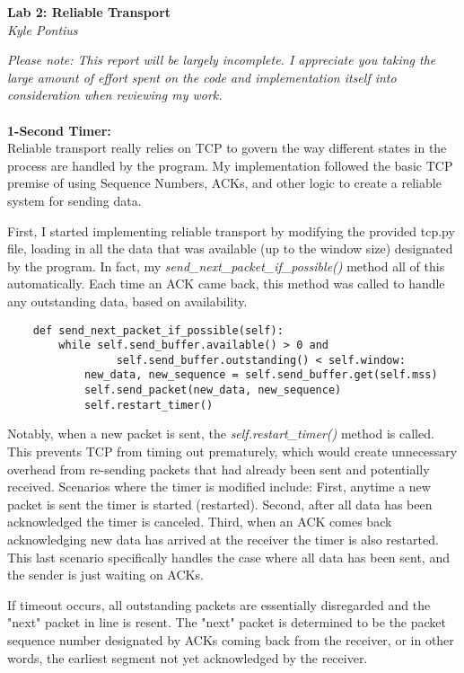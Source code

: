 \documentclass[11pt]{article}
\begin{document}
\begin{center}
  \Large\textbf{Lab 2: Reliable Transport}\\
  \large\textit{Kyle Pontius}
\end{center}

{\small  \textit{Please note: This report will be largely incomplete. I appreciate you taking the large amount of effort spent on the code and implementation itself into consideration when reviewing my work.}}\\\\
\large\textbf{1-Second Timer:}\\
Reliable transport really relies on TCP to govern the way different states in the process are handled by the program. My implementation followed the basic TCP premise of using Sequence Numbers, ACKs, and other logic to create a reliable system for sending data.

First, I started implementing reliable transport by modifying the provided tcp.py file, loading in all the data that was available (up to the window size) designated by the program. In fact, my \textit{send\_next\_packet\_if\_possible()} method all of this automatically. Each time an ACK came back, this method was called to handle any outstanding data, based on availability.

\begin{verbatim}
    def send_next_packet_if_possible(self):
        while self.send_buffer.available() > 0 and
                 self.send_buffer.outstanding() < self.window:
            new_data, new_sequence = self.send_buffer.get(self.mss)
            self.send_packet(new_data, new_sequence)
            self.restart_timer()
\end{verbatim}

Notably, when a new packet is sent, the \textit{self.restart\_timer()} method is called. This prevents TCP from timing out prematurely, which would create unnecessary overhead from re-sending packets that had already been sent and potentially received. Scenarios where the timer is modified include: First, anytime a new packet is sent the timer is started (restarted). Second, after all data has been acknowledged the timer is canceled. Third, when an ACK comes back acknowledging new data has arrived at the receiver the timer is also restarted. This last scenario specifically handles the case where all data has been sent, and the sender is just waiting on ACKs.

If timeout occurs, all outstanding packets are essentially disregarded and the "next" packet in line is resent. The "next" packet is determined to be the packet sequence number designated by ACKs coming back from the receiver, or in other words, the earliest segment not yet acknowledged by the receiver.
\end{document}
